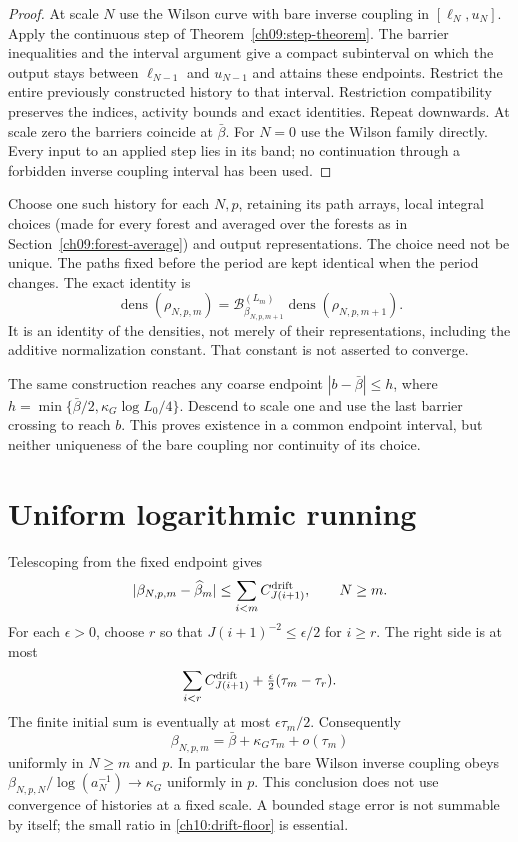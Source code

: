 \begin{proof}
At scale $N$ use the Wilson curve with bare inverse coupling in
$[\ell_N,u_N]$. Apply the continuous step of
Theorem~\ref{ch09:step-theorem}. The barrier inequalities and the
interval argument give a compact subinterval on which the output
stays between $\ell_{N-1}$ and $u_{N-1}$ and attains these endpoints.
Restrict the entire previously constructed history to that interval.
Restriction compatibility preserves the indices, activity bounds and
exact identities. Repeat downwards. At scale zero the barriers
coincide at $\bar\beta$. For $N=0$ use the Wilson family directly.
Every input to an applied step lies in its band; no continuation
through a forbidden inverse coupling interval has been used.
\end{proof}

Choose one such history for each $N,p$, retaining its path arrays,
local integral choices (made for every forest and averaged over the forests as in Section~\ref{ch09:forest-average}) and output representations. The
choice need not be unique. The paths fixed before the period are
kept identical when the period changes. The exact identity is
\[
 \operatorname{dens}(\rho_{N,p,m})
 =\mathcal B^{(L_m)}_{\beta_{N,p,m+1}}
                  \operatorname{dens}(\rho_{N,p,m+1}).
\]
It is an identity of the densities, not merely of their representations, including the additive
normalization constant. That constant is not asserted to converge.

The same construction reaches any coarse endpoint
$|b-\bar\beta|\le h$, where
$h=\min\{\bar\beta/2,\kappa_G\log L_0/4\}$.
Descend to scale one and use the last barrier crossing to reach $b$.
This proves existence in a common endpoint interval, but neither
uniqueness of the bare coupling nor continuity of its choice.

\section{Uniform logarithmic running}
\label{ch10:running}

Telescoping from the fixed endpoint gives
\begin{equation}\label{ch10:running-error}
 |\beta_{N,p,m}-\widehat\beta_m|
 \le\sum_{i<m}C^{\rm drift}_{J(i+1)},\qquad N\ge m.
\end{equation}
For each $\epsilon>0$, choose $r$ so that
$J(i+1)^{-2}\le\epsilon/2$ for $i\ge r$. The right side is at most
\[
 \sum_{i<r}C^{\rm drift}_{J(i+1)}+\tfrac\epsilon2(\tau_m-\tau_r).
\]
The finite initial sum is eventually at most $\epsilon\tau_m/2$.
Consequently
\begin{equation}\label{ch10:running-limit}
 \beta_{N,p,m}=\bar\beta+\kappa_G\tau_m+o(\tau_m)
\end{equation}
uniformly in $N\ge m$ and $p$. In particular the bare Wilson
inverse coupling obeys $\beta_{N,p,N}/\log(a_N^{-1})\to\kappa_G$ uniformly
in $p$. This conclusion does not use convergence of histories at a
fixed scale. A bounded stage error is not summable by itself; the
small ratio in \eqref{ch10:drift-floor} is essential.

